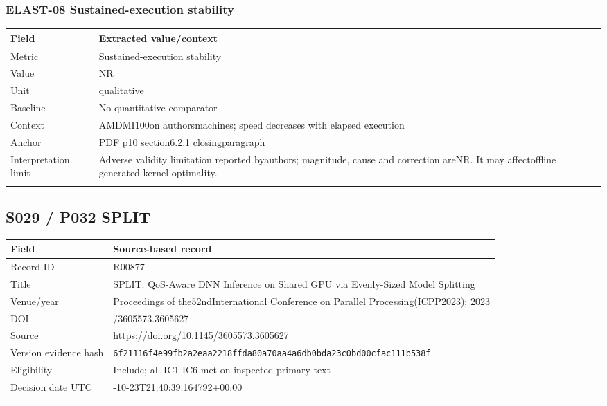 \subsubsection*{ELAST-08 Sustained-execution stability}
\begin{longtable}{>{\raggedright\arraybackslash}p{}>{\raggedright\arraybackslash}p{}}
\toprule
\textbf{Field} & \textbf{Extracted value/context}\\\midrule\endhead
Metric & Sustained-execution stability\\\addlinespace
Value & NR\\\addlinespace
Unit & qualitative\\\addlinespace
Baseline & No quantitative comparator\\\addlinespace
Context & AMDMI100on authorsmachines;\allowbreak{} speed decreases with elapsed execution\\\addlinespace
Anchor & PDF p10 section6.2.1 closingparagraph\\\addlinespace
Interpretation limit & Adverse validity limitation reported byauthors;\allowbreak{} magnitude,\allowbreak{} cause and correction areNR. It may affectoffline generated kernel optimality.\\\addlinespace
\bottomrule\end{longtable}
\clearpage\subsection{S029 / P032 SPLIT}
\cite{s029}
\begin{longtable}{>{\raggedright\arraybackslash}p{}>{\raggedright\arraybackslash}p{}}
\toprule
\textbf{Field} & \textbf{Source-based record}\\\midrule\endhead
Record ID & R00877\\\addlinespace
Title & SPLIT: QoS-Aware DNN Inference on Shared GPU via Evenly-Sized Model Splitting\\\addlinespace
Venue/year & Proceedings of the52ndInternational Conference on Parallel Processing(ICPP2023);\allowbreak{} 2023\\\addlinespace
DOI & 10.1145/3605573.3605627\\\addlinespace
Source & \url{https://doi.org/10.1145/3605573.3605627}\\\addlinespace
Version evidence hash & \nolinkurl{6f21116f4e99fb2a2eaa2218ffda80a70aa4a6db0bda23c0bd00cfac111b538f}\\\addlinespace
Eligibility & Include;\allowbreak{} all IC1-IC6 met on inspected primary text\\\addlinespace
Decision date UTC & 2026-10-23T21:40:39.164792+00:00\\\addlinespace
\bottomrule\end{longtable}
